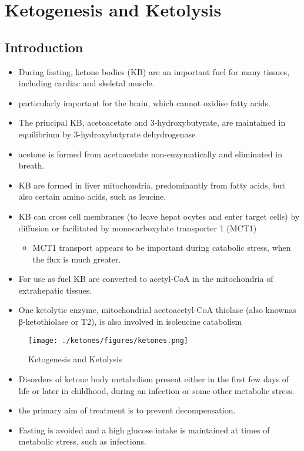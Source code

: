 \documentclass{scrartcl}
\begin{document}
\section{Ketogenesis and Ketolysis}
\label{sec:org601968d}
\subsection{Introduction}
\label{sec:org50eb6d9}

\begin{itemize}
\item During fasting, ketone bodies (KB) are an important fuel for many
tissues, including cardiac and skeletal muscle.
\item particularly important for the brain, which cannot oxidise fatty acids.
\item The principal KB, acetoacetate and 3-hydroxybutyrate, are
maintained in equilibrium by 3-hydroxybutyrate dehydrogenase
\item acetone is formed from acetoacetate non-enzymatically and eliminated in breath.
\item KB are formed in liver mitochondria, predominantly from fatty acids,
but also certain amino acids, such as leucine.
\item KB can cross cell membranes (to leave hepat ocytes and enter target
cells) by diffusion or facilitated by monocarboxylate transporter 1 (MCT1)
\begin{itemize}
\item MCT1 transport appears to be important during catabolic stress,
when the flux is much greater.
\end{itemize}
\item For use as fuel KB are converted to acetyl-CoA in the mitochondria of extrahepatic tissues.
\item One ketolytic enzyme, mitochondrial acetoacetyl-CoA thiolase (also
knownas β-ketothiolase or T2), is also involved in isoleucine catabolism
\end{itemize}

\begin{figure}[htbp]
\centering
\texttt{[image: ./ketones/figures/ketones.png]}
\caption{\label{fig:org490a3b2}
Ketogenesis and Ketolysis}
\end{figure}

\begin{itemize}
\item Disorders of ketone body metabolism present either in the first few
days of life or later in childhood, during an infection or some
other metabolic stress.
\item the primary aim of treatment is to prevent decompensation.
\item Fasting is avoided and a high glucose intake is maintained at times
of metabolic stress, such as infections.
\end{itemize}
\end{document}
